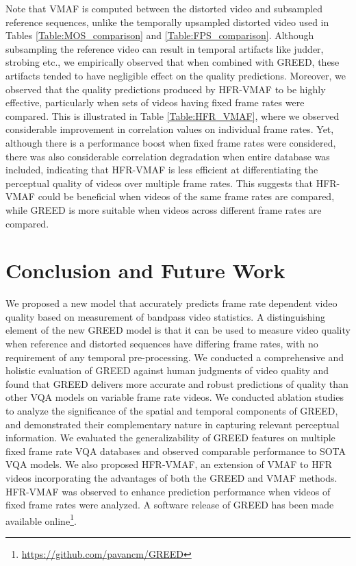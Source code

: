 \documentclass[journal]{IEEEtran}
\begin{document}
Note that VMAF is computed between the distorted video  and subsampled reference  sequences, unlike the temporally upsampled distorted video  used in Tables \ref{Table:MOS_comparison} and \ref{Table:FPS_comparison}. Although subsampling the reference video can result in temporal artifacts like judder, strobing etc., we empirically observed that when combined with GREED, these artifacts tended to have negligible effect on the quality predictions. Moreover, we observed that the quality predictions produced by HFR-VMAF to be highly effective, particularly when sets of videos having fixed frame rates were compared. This is illustrated in Table \ref{Table:HFR_VMAF}, where we observed considerable improvement in correlation values on individual frame rates. Yet, although there is a performance boost when fixed frame rates were considered, there was also considerable correlation degradation when entire database was included, indicating that HFR-VMAF is less efficient at differentiating the perceptual quality of videos over multiple frame rates. This suggests that HFR-VMAF could be beneficial when videos of the same frame rates are compared, while GREED is more suitable when videos across different frame rates are compared. 

\section{Conclusion and Future Work}
\label{sec:conclusion}
We proposed a new model that accurately predicts frame rate dependent video quality based on measurement of bandpass video statistics. A distinguishing element of the new GREED model is that it can be used to measure video quality when reference and distorted sequences have differing frame rates, with no requirement of any temporal pre-processing. We conducted a comprehensive and holistic evaluation of GREED against human judgments of video quality and found that GREED delivers more accurate and robust predictions of quality than other VQA models on variable frame rate videos. We conducted ablation studies to analyze the significance of the spatial and temporal components of GREED, and demonstrated their complementary nature in capturing relevant perceptual information. We evaluated the generalizability of GREED features on multiple fixed frame rate VQA databases and observed comparable performance to SOTA VQA models. We also proposed HFR-VMAF, an extension of VMAF to HFR videos incorporating the advantages of both the GREED and VMAF methods. HFR-VMAF was observed to enhance prediction performance when videos of fixed frame rates were analyzed. A software release of GREED has been made available online\footnote{\url{https://github.com/pavancm/GREED}}.
\end{document}
